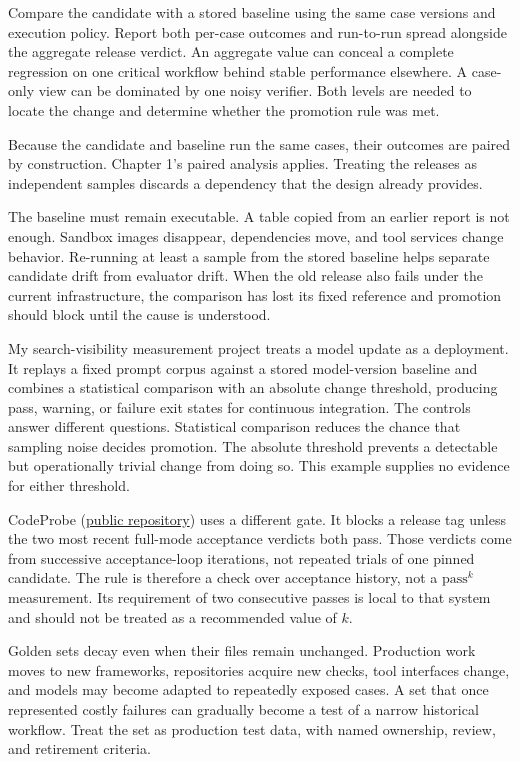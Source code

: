 Compare the candidate with a stored baseline using the same case versions and execution policy. Report both per-case outcomes and run-to-run spread alongside the aggregate release verdict. An aggregate value can conceal a complete regression on one critical workflow behind stable performance elsewhere. A case-only view can be dominated by one noisy verifier. Both levels are needed to locate the change and determine whether the promotion rule was met.

Because the candidate and baseline run the same cases, their outcomes are paired by construction. Chapter 1's paired analysis applies. Treating the releases as independent samples discards a dependency that the design already provides.

The baseline must remain executable. A table copied from an earlier report is not enough. Sandbox images disappear, dependencies move, and tool services change behavior. Re-running at least a sample from the stored baseline helps separate candidate drift from evaluator drift. When the old release also fails under the current infrastructure, the comparison has lost its fixed reference and promotion should block until the cause is understood.

My search-visibility measurement project treats a model update as a deployment. It replays a fixed prompt corpus against a stored model-version baseline and combines a statistical comparison with an absolute change threshold, producing pass, warning, or failure exit states for continuous integration. The controls answer different questions. Statistical comparison reduces the chance that sampling noise decides promotion. The absolute threshold prevents a detectable but operationally trivial change from doing so. This example supplies no evidence for either threshold.

CodeProbe (\href{https://github.com/sjarmak/codeprobe}{public repository}) uses a different gate. It blocks a release tag unless the two most recent full-mode acceptance verdicts both pass. Those verdicts come from successive acceptance-loop iterations, not repeated trials of one pinned candidate. The rule is therefore a check over acceptance history, not a \(\mathrm{pass}^{k}\) measurement. Its requirement of two consecutive passes is local to that system and should not be treated as a recommended value of \(k\).

Golden sets decay even when their files remain unchanged. Production work moves to new frameworks, repositories acquire new checks, tool interfaces change, and models may become adapted to repeatedly exposed cases. A set that once represented costly failures can gradually become a test of a narrow historical workflow. Treat the set as production test data, with named ownership, review, and retirement criteria.


